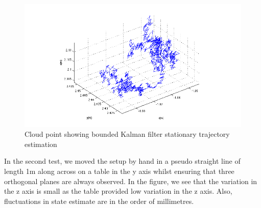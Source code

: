 \documentclass[]{article}
\begin{document}
{\begin{figure}[H]
	\begin{center}
		\includegraphics[width = \textwidth]{stationaryTraj.png}
	\end{center}
	\caption{Cloud point showing bounded Kalman filter stationary trajectory estimation}
	\label{fig:stationary_trajectory}
\end{figure}
In the second test, we moved the setup by hand in a pseudo straight line of length 1m along across on a table in the y axis whilst ensuring that three orthogonal planes are always observed. In the figure, we see that the variation in the z axis is small as the table provided low variation in the z axis. Also, fluctuations in state estimate are in the order of millimetres.

}
\end{document}
